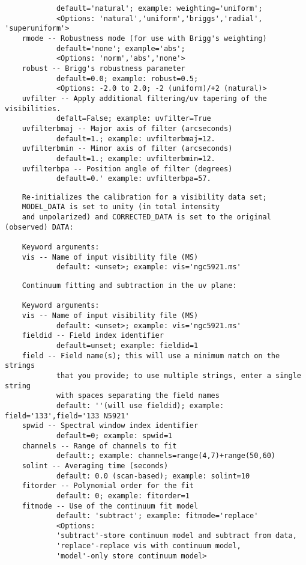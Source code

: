 \begin{verbatim}
            default='natural'; example: weighting='uniform'; 
            <Options: 'natural','uniform','briggs','radial', 'superuniform'>
    rmode -- Robustness mode (for use with Brigg's weighting)
            default='none'; example='abs'; 
            <Options: 'norm','abs','none'>
    robust -- Brigg's robustness parameter 
            default=0.0; example: robust=0.5; 
            <Options: -2.0 to 2.0; -2 (uniform)/+2 (natural)>
    uvfilter -- Apply additional filtering/uv tapering of the visibilities.
            defalt=False; example: uvfilter=True
    uvfilterbmaj -- Major axis of filter (arcseconds)
            default=1.; example: uvfilterbmaj=12.
    uvfilterbmin -- Minor axis of filter (arcseconds)
            default=1.; example: uvfilterbmin=12.
    uvfilterbpa -- Position angle of filter (degrees)
            default=0.' example: uvfilterbpa=57.
\end{verbatim}
\normalsize

\vspace{3mm}
\small
\begin{verbatim}
    Re-initializes the calibration for a visibility data set;
    MODEL_DATA is set to unity (in total intensity 
    and unpolarized) and CORRECTED_DATA is set to the original (observed) DATA:
    
    Keyword arguments:
    vis -- Name of input visibility file (MS)
            default: <unset>; example: vis='ngc5921.ms'

\end{verbatim}
\normalsize

\vspace{3mm}
\small
\begin{verbatim}
    Continuum fitting and subtraction in the uv plane:
    
    Keyword arguments:
    vis -- Name of input visibility file (MS)
            default: <unset>; example: vis='ngc5921.ms'
    fieldid -- Field index identifier
            default=unset; example: fieldid=1
    field -- Field name(s); this will use a minimum match on the strings
            that you provide; to use multiple strings, enter a single string
            with spaces separating the field names
            default: ''(will use fieldid); example: field='133',field='133 N5921'
    spwid -- Spectral window index identifier
            default=0; example: spwid=1
    channels -- Range of channels to fit
            default:; example: channels=range(4,7)+range(50,60)
    solint -- Averaging time (seconds)
            default: 0.0 (scan-based); example: solint=10
    fitorder -- Polynomial order for the fit
            default: 0; example: fitorder=1
    fitmode -- Use of the continuum fit model
            default: 'subtract'; example: fitmode='replace'
            <Options: 
            'subtract'-store continuum model and subtract from data,
            'replace'-replace vis with continuum model,
            'model'-only store continuum model>
\end{verbatim}
\normalsize

